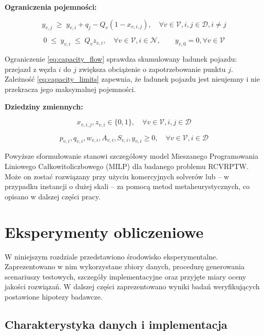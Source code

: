 \textbf{Ograniczenia pojemności:}

\begin{equation}\label{eq:capacity_flow}
y_{v,j} \;\ge\; y_{v,i} + q_j - Q_v(1 - x_{v,i,j}), \quad \forall v \in \mathcal{V}, i,j \in \mathcal{D}, i \neq j
\end{equation}

\begin{equation}\label{eq:capacity_limits}
0 \;\le\; y_{v,i} \;\le\; Q_v z_{v,i}, \quad \forall v \in \mathcal{V}, i \in \mathcal{N}, \qquad y_{v,0} = 0, \forall v \in \mathcal{V}
\end{equation}

Ograniczenie \eqref{eq:capacity_flow} sprawdza skumulowany ładunek pojazdu: przejazd z węzła $i$ do $j$ zwiększa obciążenie o zapotrzebowanie punktu $j$. Zależność \eqref{eq:capacity_limits} zapewnia, że ładunek pojazdu jest nieujemny i nie przekracza jego maksymalnej pojemności.

\textbf{Dziedziny zmiennych:}

\begin{equation}
     x_{v,i,j}, z_{v,i}\in\{0,1\}, \quad \forall v \in \mathcal{V}, i,j \in \mathcal{D}
\end{equation}

\begin{equation}
     p_{v,i}, q_{v,i}, w_{v,i}, A_{v,i}, S_{v,i}, y_{v,i} \geq 0, \quad \forall v \in \mathcal{V}, i \in \mathcal{D}
\end{equation}

Powyższe sformułowanie stanowi szczegółowy model Mieszanego Programowania Liniowego Całkowitoliczbowego (MILP) dla badanego problemu RCVRPTW. Może on zostać rozwiązany przy użyciu komercyjnych solverów lub – w przypadku instancji o dużej skali – za pomocą metod metaheurystycznych, co opisano w dalszej części pracy.

\section{Eksperymenty obliczeniowe}
W niniejszym rozdziale przedstawiono środowisko eksperymentalne. Zaprezentowano w nim wykorzystane zbiory danych, procedurę generowania scenariuszy testowych, szczegóły implementacyjne oraz przyjęte miary oceny jakości rozwiązań. W dalszej części zaprezentowano wyniki badań weryfikujących postawione hipotezy badawcze.

\subsection{Charakterystyka danych i implementacja}

